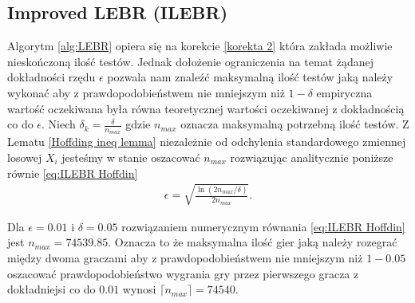\documentclass[inzynierska]{pwr_wmat_praca_dyplomowa}
\theoremstyle{plain}
\numberwithin{theorem}{chapter}
\theoremstyle{definition}
\numberwithin{theorem}{chapter}
\begin{document}
	\subsection{Improved LEBR (ILEBR)}
	Algorytm \ref{alg:LEBR} opiera się na korekcie \ref{korekta 2} która zakłada możliwie nieskończoną ilość testów. Jednak dołożenie ograniczenia na temat żądanej dokładności rzędu $\epsilon$ pozwala nam znaleźć maksymalną ilość testów jaką należy wykonać aby z prawdopodobieństwem nie mniejszym niż $1-\delta$ empiryczna wartość oczekiwana była równa teoretycznej wartości oczekiwanej z dokładnością co do $\epsilon$. Niech $\delta_k = \frac{\delta}{n_{max}}$ gdzie $n_{max}$ oznacza maksymalną potrzebną ilość testów. Z Lematu \ref{Hoffding ineq lemma} niezależnie od odchylenia standardowego zmiennej losowej $X_i$ jesteśmy w stanie oszacować $n_{max}$ rozwiązując analitycznie poniższe równie \ref{eq:ILEBR Hoffdin}
	\begin{gather}
		\label{eq:ILEBR Hoffdin}
		\epsilon =  \sqrt{\frac{\ln(2n_{max}/\delta)}{2n_{max}}}.
	\end{gather}

	Dla $\epsilon=0.01$ i $\delta=0.05$ rozwiązaniem numerycznym równania \ref{eq:ILEBR Hoffdin} jest $n_{max}=74539.85$.
	Oznacza to że maksymalna ilość gier jaką  należy rozegrać między dwoma graczami aby z prawdopodobieństwem nie mniejszym niż $1-0.05$ oszacować prawdopodobieństwo wygrania gry przez pierwszego gracza z dokładniejsi co do $0.01$ wynosi $\lceil n_{max} \rceil = 74540$. 
	   
\end{document}
